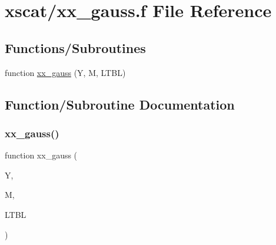 \hypertarget{xx__gauss_8f}{}\section{xscat/xx\+\_\+gauss.f File Reference}
\label{xx__gauss_8f}
\subsection*{Functions/\+Subroutines}
\begin{DoxyCompactItemize}
\item 
function \hyperlink{xx__gauss_8f_a142e2cf7fa96a91707185af52dfb00b3}{xx\+\_\+gauss} (Y, M, L\+T\+BL)
\end{DoxyCompactItemize}


\subsection{Function/\+Subroutine Documentation}
\mbox{\label{xx__gauss_8f_a142e2cf7fa96a91707185af52dfb00b3}} 
\subsubsection{\texorpdfstring{xx\+\_\+gauss()}{xx\_gauss()}}
{\footnotesize\ttfamily function xx\+\_\+gauss (\begin{DoxyParamCaption}\item[{}]{Y,  }\item[{}]{M,  }\item[{}]{L\+T\+BL }\end{DoxyParamCaption})}

